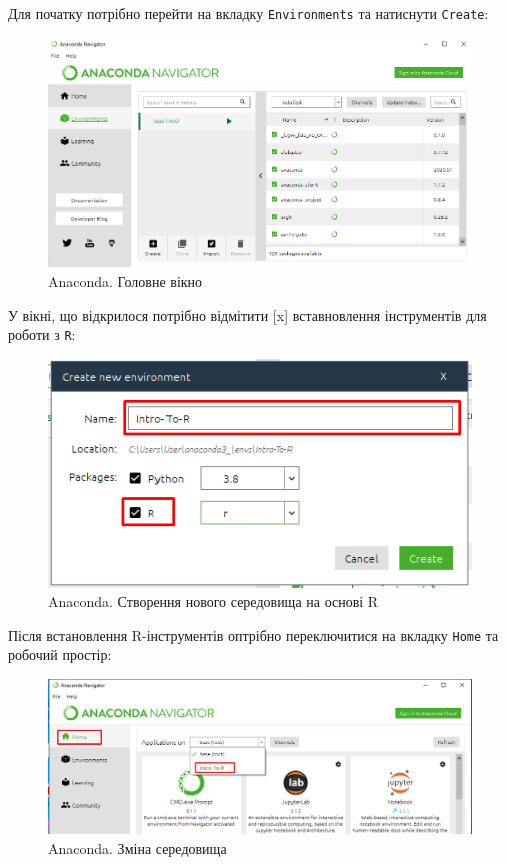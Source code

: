 \documentclass[
]{book}
\begin{document}
Для початку потрібно перейти на вкладку \texttt{Environments} та натиснути \texttt{Create}:

\begin{figure}
\centering
\includegraphics{images/chapter1/anaconda_2.png}
\caption{\label{fig:unnamed-chunk-24}Anaconda. Головне вікно}
\end{figure}

У вікні, що відкрилося потрібно відмітити {[}x{]} вставновлення інструментів для роботи з \texttt{R}:

\begin{figure}
\centering
\includegraphics{images/chapter1/anaconda_3.png}
\caption{\label{fig:unnamed-chunk-25}Anaconda. Створення нового середовища на основі R}
\end{figure}

Після встановлення R-інструментів оптрібно переключитися на вкладку \texttt{Home} та робочий простір:

\begin{figure}
\centering
\includegraphics{images/chapter1/anaconda_4.png}
\caption{\label{fig:unnamed-chunk-26}Anaconda. Зміна середовища}
\end{figure}
\end{document}

